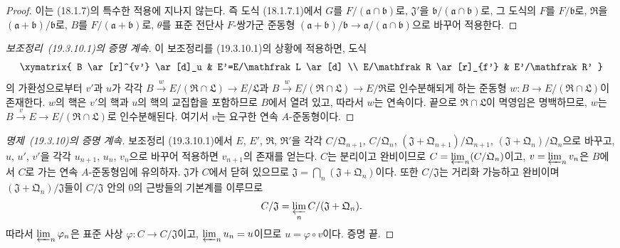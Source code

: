 \begin{proof}
이는 (18.1.7)의 특수한 적용에 지나지 않는다. 즉 도식 (18.1.7.1)에서
$G$를 $F/(\mathfrak a\cap\mathfrak b)$로, $\mathfrak J'$을
$\mathfrak b/(\mathfrak a\cap\mathfrak b)$로, 그 도식의 $F$를
$F/\mathfrak b$로, $\mathfrak R$을
$(\mathfrak a+\mathfrak b)/\mathfrak b$로, $B$를
$F/(\mathfrak a+\mathfrak b)$로, $\theta$를 표준 전단사
$F$-쌍가군 준동형
$(\mathfrak a+\mathfrak b)/\mathfrak b
\to\mathfrak a/(\mathfrak a\cap\mathfrak b)$으로 바꾸어 적용한다.
\end{proof}


\begin{proof}[보조정리~{\rm(19.3.10.1)}의 증명 계속]
이 보조정리를 (19.3.10.1)의 상황에 적용하면, 도식
\[
\xymatrix{
  B \ar[r]^{v'} \ar[d]_u & E'=E/\mathfrak L \ar[d] \\
  E/\mathfrak R \ar[r]_{f'} & E'/\mathfrak R'
}
\]
의 가환성으로부터 $v'$과 $u$가 각각
$B\xrightarrow{w}E/(\mathfrak R\cap\mathfrak L)\to E/\mathfrak L$과
$B\xrightarrow{w}E/(\mathfrak R\cap\mathfrak L)\to E/\mathfrak R$로
인수분해되게 하는 준동형
$w:B\to E/(\mathfrak R\cap\mathfrak L)$이 존재한다. $w$의 핵은
$v'$의 핵과 $u$의 핵의 교집합을 포함하므로 $B$에서 열려 있고,
따라서 $w$는 연속이다. 끝으로 $\mathfrak R\cap\mathfrak L$이
멱영임은 명백하므로, $w$는
$B\xrightarrow{v}E\to E/(\mathfrak R\cap\mathfrak L)$로
인수분해된다. 여기서 $v$는 요구한 연속 $A$-준동형이다.
\end{proof}

\begin{proof}[명제~{\rm(19.3.10)}의 증명 계속]
보조정리 (19.3.10.1)에서 $E$, $E'$, $\mathfrak R$,
$\mathfrak R'$을 각각 $C/\mathfrak Q_{n+1}$, $C/\mathfrak Q_n$,
$(\mathfrak J+\mathfrak Q_{n+1})/\mathfrak Q_{n+1}$,
$(\mathfrak J+\mathfrak Q_n)/\mathfrak Q_n$으로 바꾸고, $u$, $u'$,
$v'$을 각각 $u_{n+1}$, $u_n$, $v_n$으로 바꾸어 적용하면
$v_{n+1}$의 존재를 얻는다. $C$는 분리이고 완비이므로
$C=\varprojlim_n(C/\mathfrak Q_n)$이고,
$v=\varprojlim_n v_n$은 $B$에서 $C$로 가는 연속 $A$-준동형임에
유의하자. $\mathfrak J$가 $C$에서 닫혀 있으므로
$\mathfrak J=\bigcap_n(\mathfrak J+\mathfrak Q_n)$이다. 또한
$C/\mathfrak J$는 거리화 가능하고 완비이며
$(\mathfrak J+\mathfrak Q_n)/\mathfrak J$들이 $C/\mathfrak J$ 안의
$0$의 근방들의 기본계를 이루므로
\[
  C/\mathfrak J=\varprojlim_n C/(\mathfrak J+\mathfrak Q_n).
\]
따라서 $\varprojlim_n\varphi_n$은 표준 사상
$\varphi:C\to C/\mathfrak J$이고,
$\varprojlim_n u_n=u$이므로 $u=\varphi\circ v$이다. 증명 끝.
\end{proof}

